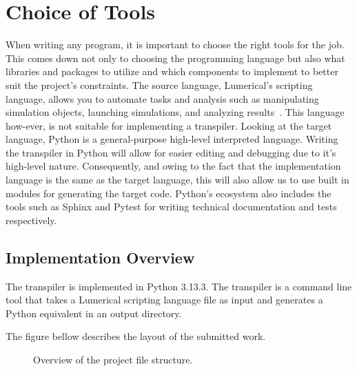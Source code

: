 \section{Choice of Tools}
When writing any program, it is important to choose the right tools for the job. This comes down not only to choosing the programming language but also what libraries and packages to utilize and which components to implement to better suit the project's constraints. The source language, Lumerical's scripting language, allows you to automate tasks and analysis such as manipulating simulation objects, launching simulations, and analyzing results~\cite{ansys_lsf}. This language how-ever, is not suitable for implementing a transpiler. Looking at the target language, Python is a general-purpose high-level interpreted language. Writing the transpiler in Python will allow for easier editing and debugging due to it's high-level nature. Consequently, and owing to the fact that the implementation language is the same as the target language, this will also allow us to use built in modules for generating the target code. Python's ecosystem also includes the tools such as Sphinx and Pytest for writing technical documentation and tests respectively.

\subsection{Implementation Overview}

The transpiler is implemented in Python 3.13.3. The transpiler is a command line tool that takes a Lumerical scripting language file as input and generates a Python equivalent in an output directory.

The figure bellow describes the layout of the submitted work. 

\begin{figure}[H]\label{fig:project-structure}
\centering
{}

\caption{Overview of the project file structure.}
\end{figure}


